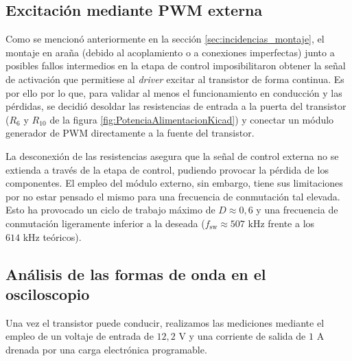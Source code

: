 \documentclass[12pt]{report} %
\begin{document}
\subsection{Excitación mediante PWM externa}
\label{subsec:pwm_externa}
Como se mencionó anteriormente en la sección \ref{sec:incidencias_montaje}, el montaje en araña (debido al acoplamiento o a conexiones imperfectas) junto a posibles fallos intermedios en la etapa de control imposibilitaron obtener la señal de activación que permitiese al \textit{driver} excitar al transistor de forma continua. Es por ello por lo que, para validar al menos el funcionamiento en conducción y las pérdidas, se decidió desoldar las resistencias de entrada a la puerta del transistor ($R_{6}$ y $R_{10}$ de la figura \ref{fig:PotenciaAlimentacionKicad}) y conectar un módulo generador de PWM directamente a la fuente del transistor. 

La desconexión de las resistencias asegura que la señal de control externa no se extienda a través de la etapa de control, pudiendo provocar la pérdida de los componentes. El empleo del módulo externo, sin embargo, tiene sus limitaciones por no estar pensado el mismo para una frecuencia de conmutación tal elevada. Esto ha provocado un ciclo de trabajo máximo de $D \approx 0{,}6$ y una frecuencia de conmutación ligeramente inferior a la deseada ($f_{\text{sw}} \approx 507\text{ kHz}$ frente a los $614\text{ kHz}$ teóricos).
\subsection{Análisis de las formas de onda en el osciloscopio}
\label{subsec:analisis_osciloscopio}
Una vez el transistor puede conducir, realizamos las mediciones mediante el empleo de un voltaje de entrada de $12{,}2\text{ V}$ y una corriente de salida de $1\text{ A}$ drenada por una carga electrónica programable. 
\end{document}
